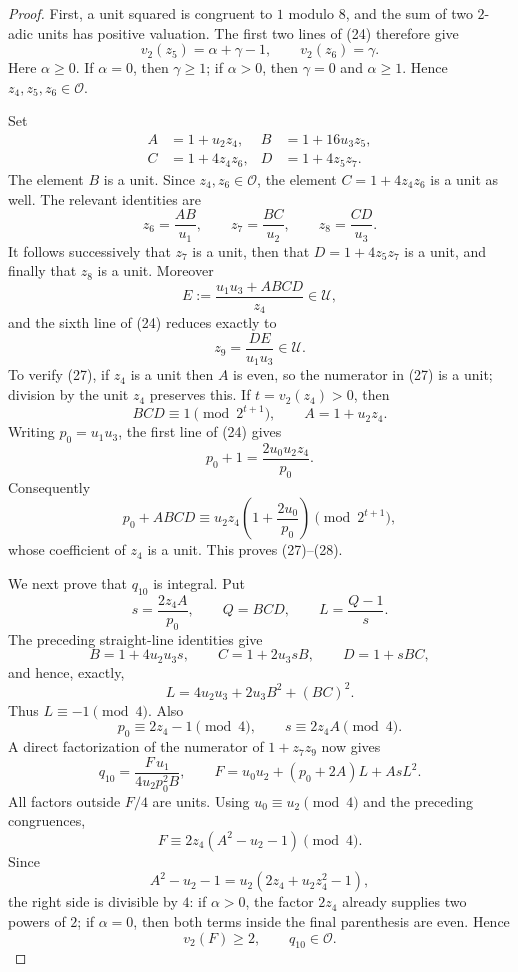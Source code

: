 \documentclass[11pt]{article}
\theoremstyle{remark}
\newcommand{\Ot}{\mathcal O}
\newcommand{\Ut}{\mathcal U}
\newcommand{\vt}{v_2}
\begin{document}
\begin{proof}
First, a unit squared is congruent to \(1\) modulo \(8\), and the sum of
two \(2\)-adic units has positive valuation.  The first two lines of (24)
therefore give
\[
 \vt(z_5)=\alpha+\gamma-1,\qquad \vt(z_6)=\gamma.
\]
Here \(\alpha\geq0\).  If \(\alpha=0\), then \(\gamma\geq1\); if
\(\alpha>0\), then \(\gamma=0\) and \(\alpha\geq1\).  Hence
\(z_4,z_5,z_6\in\Ot\).

Set
\[
\begin{aligned}
A&=1+u_2z_4,& B&=1+16u_3z_5,\\
C&=1+4z_4z_6,& D&=1+4z_5z_7.
\end{aligned}
\]
The element \(B\) is a unit.  Since \(z_4,z_6\in\Ot\), the element
\(C=1+4z_4z_6\) is a unit as well.  The relevant identities are
\[
 z_6=\frac{AB}{u_1},\qquad
 z_7=\frac{BC}{u_2},\qquad
 z_8=\frac{CD}{u_3}.
\]
It follows successively that \(z_7\) is a unit, then that
\(D=1+4z_5z_7\) is a unit, and finally that \(z_8\) is a unit.  Moreover
\[
 E:=\frac{u_1u_3+ABCD}{z_4}\in\Ut,                               \tag{27}
\]
and the sixth line of (24) reduces exactly to
\[
 z_9=\frac{DE}{u_1u_3}\in\Ut.                                  \tag{28}
\]
To verify (27), if \(z_4\) is a unit then \(A\) is even, so the numerator
in (27) is a unit; division by the unit \(z_4\) preserves this.  If \(t=\vt(z_4)>0\), then
\[
 BCD\equiv1\pmod{2^{t+1}},\qquad A=1+u_2z_4.
\]
Writing \(p_0=u_1u_3\), the first line of (24) gives
\[
 p_0+1=\frac{2u_0u_2z_4}{p_0}.
\]
Consequently
\[
 p_0+ABCD
 \equiv
 u_2z_4\left(1+\frac{2u_0}{p_0}\right)
 \pmod{2^{t+1}},
\]
whose coefficient of \(z_4\) is a unit.  This proves (27)--(28).

We next prove that \(q_{10}\) is integral.  Put
\[
 s=\frac{2z_4A}{p_0},\qquad Q=BCD,\qquad L=\frac{Q-1}{s}.
\]
The preceding straight-line identities give
\[
 B=1+4u_2u_3s,\qquad
 C=1+2u_3sB,\qquad
 D=1+sBC,
\]
and hence, exactly,
\[
 L=4u_2u_3+2u_3B^2+(BC)^2.
\]
Thus \(L\equiv-1\pmod4\).  Also
\[
 p_0\equiv2z_4-1\pmod4,\qquad s\equiv2z_4A\pmod4.
\]
A direct factorization of the numerator of \(1+z_7z_9\) now gives
\[
 q_{10}=\frac{F\,u_1}{4u_2p_0^2B},
 \qquad
 F=u_0u_2+(p_0+2A)L+AsL^2.
\]
All factors outside \(F/4\) are units.  Using \(u_0\equiv u_2\pmod4\)
and the preceding congruences,
\[
 F\equiv2z_4(A^2-u_2-1)\pmod4.
\]
Since
\[
 A^2-u_2-1=u_2(2z_4+u_2z_4^2-1),
\]
the right side is divisible by \(4\): if \(\alpha>0\), the factor
\(2z_4\) already supplies two powers of \(2\); if \(\alpha=0\), then
both terms inside the final parenthesis are even.  Hence
\[
 \vt(F)\geq2,\qquad q_{10}\in\Ot.
\]


\end{proof}
\end{document}
